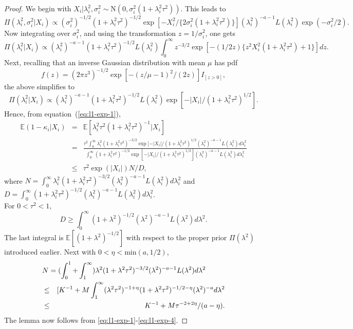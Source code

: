 \documentclass[10pt,a4paper]{amsart}
\begin{document}
\begin{proof}
We begin with $X_i|\lambda_i^2,\sigma_i^2\sim\mbox{N}(0,\sigma_i^2
(1+\lambda_i^2\tau^2))$. This leads to
\[
\Pi(\lambda_i^2,\sigma_i^2|X_i)\propto(\sigma_i^2)^{-1/2}(1+\lambda_i^2\tau^2)
^{-1/2}\exp[-X_i^2/\{2\sigma_i^2(1+\lambda_i^2\tau^2)\}](\lambda_i^2)^{-a-1}
L(\lambda_i^2)\exp(-\sigma_i^2/2).
\]
Now integrating over $\sigma_i^2$, and using the transformation 
$z=1/\sigma_i^2$, one gets
\[
\Pi(\lambda_i^2|X_i)\propto(\lambda_i^2)^{-a-1}(1+\lambda_i^2\tau^2)^{-1/2}
L(\lambda_i^2)\int_{0}^{\infty}z^{-3/2}\exp[-(1/2z)\{z^2X_i^2(1+\lambda_i^2\tau^2)+1\}]dz.
\]
Next, recalling that an inverse Gaussian distribution with mean $\mu$ has pdf
\[
f(z)=(2\pi z^3)^{-1/2}\exp[-(z/\mu-1)^2/(2z)]I_{[z>0]},
\]
the above simplifies to
\begin{equation}
\Pi(\lambda_i^2|X_i)\propto(\lambda_i^2)^{-a-1}(1+\lambda_i^2\tau^2)^{-1/2}
L(\lambda_i^2)\exp[-|X_i|/(1+\lambda_i^2\tau^2)^{1/2}].
\label{eq:l1-exp-1}
\end{equation}
Hence, from equation~(\ref{eq:l1-exp-1}),
\begin{eqnarray}
\mathbb{E}(1-\kappa_i|X_i) & = & \mathbb{E}[\lambda_i^2\tau^2(1+\lambda_i^2\tau^2)^{-1}|X_i]
\nonumber\\ & = & \frac{\tau^2\int_{0}^{\infty}\lambda_i^2
(1+\lambda_i^2\tau^2)^{-3/2}\exp[-|X_i|/(1+\lambda_i^2\tau^2)^{1/2}
(\lambda_i^2)^{-a-1}L(\lambda_i^2)d\lambda_i^2}
{\int_{0}^{\infty}(1+\lambda_i^2\tau^2)^{-1/2}
\exp[-|X_i|/(1+\lambda_i^2\tau^2)^{1/2}](\lambda_i^2)^{-a-1}
L(\lambda_i^2)d\lambda_i^2}\nonumber\\ & \leq & \tau^2\exp(|X_i|)N/D,
\label{eq:l1-exp-2}
\end{eqnarray}
where $N=\int_{0}^{\infty}\lambda_i^2(1+\lambda_i^2\tau^2)^{-3/2}
(\lambda_i^2)^{-a-1}L(\lambda_i^2)d\lambda_i^2$ and 
$D=\int_{0}^{\infty}(1+\lambda_i^2\tau^2)^{-1/2}(\lambda_i^2)^{-a-1}
L(\lambda_i^2)d\lambda_i^2$.\\

\noindent
For $0<\tau^2<1$, 
\begin{equation}
D\geq \int_0^\infty (1+\lambda^2)^{-1/2}(\lambda^2)^{-a-1}L(\lambda^2)d\lambda^2.
\label{eq:l1-exp-3}
\end{equation}
The last integral is $\mathbb{E}[(1+\lambda^2)^{-1/2}]$ with respect to the proper
prior $\Pi(\lambda^2)$ introduced earlier. 
Next with $0<\eta<\mbox{min}(a,1/2)$,
\begin{eqnarray}
\lefteqn{ N=(\int_{0}^{1} +\int_{1}^{\infty})\lambda^2
(1+\lambda^2\tau^2)^{-3/2}(\lambda^2)^{-a-1}L(\lambda^2)d\lambda^2}\nonumber\\
 & \leq & [K^{-1}+M\int_{1}^{\infty}(\lambda^2\tau^2)^{-1+\eta}
(1+\lambda^2\tau^2)^{-1/2-\eta}(\lambda^2)^{-a}d\lambda^2\nonumber\\
 & \leq & 
K^{-1}+M\tau^{-2+2\eta}/(a-\eta).
\label{eq:l1-exp-4}
\end{eqnarray}
The lemma now follows from \eqref{eq:l1-exp-1}-\eqref{eq:l1-exp-4}.
\end{proof}
\end{document}
